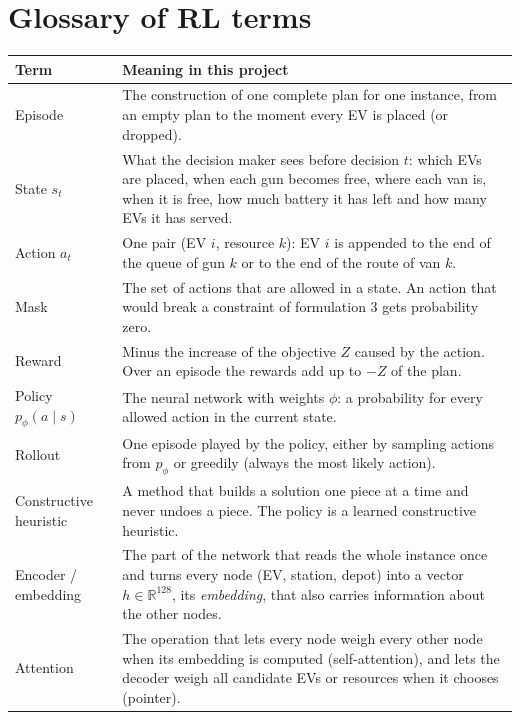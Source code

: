 \section{Glossary of RL terms}
\label{sec:glossary}

{\small
\begin{longtable}{@{}>{\raggedright\arraybackslash}p{3.6cm}>{\raggedright\arraybackslash}p{12.4cm}@{}}
\toprule
\textbf{Term} & \textbf{Meaning in this project} \\
\midrule
\endhead
Episode & The construction of one complete plan for one instance, from an empty plan to the moment every EV is placed (or dropped). \\
State $s_t$ & What the decision maker sees before decision $t$: which EVs are placed, when each gun becomes free, where each van is, when it is free, how much battery it has left and how many EVs it has served. \\
Action $a_t$ & One pair (EV $i$, resource $k$): EV $i$ is appended to the end of the queue of gun $k$ or to the end of the route of van $k$. \\
Mask & The set of actions that are allowed in a state. An action that would break a constraint of formulation 3 gets probability zero. \\
Reward & Minus the increase of the objective $Z$ caused by the action. Over an episode the rewards add up to $-Z$ of the plan. \\
Policy $p_\phi(a\mid s)$ & The neural network with weights $\phi$: a probability for every allowed action in the current state. \\
Rollout & One episode played by the policy, either by sampling actions from $p_\phi$ or greedily (always the most likely action). \\
Constructive heuristic & A method that builds a solution one piece at a time and never undoes a piece. The policy is a learned constructive heuristic. \\
Encoder / embedding & The part of the network that reads the whole instance once and turns every node (EV, station, depot) into a vector $h\in\mathbb R^{128}$, its \emph{embedding}, that also carries information about the other nodes. \\
Attention & The operation that lets every node weigh every other node when its embedding is computed (self-attention), and lets the decoder weigh all candidate EVs or resources when it chooses (pointer). \\

\end{longtable}}
